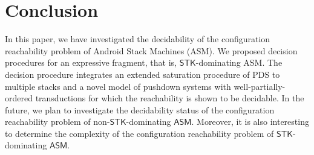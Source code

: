 \documentclass[preprint,12pt]{elsarticle}
\newcommand{\AMASS}{\textsf{ASM}}
\newcommand{\STK}{\mathsf{STK}}
\newcommand{\PDS}{\textsf{PDS}}
\begin{document}
\section{Conclusion}
% 
In this paper, we have investigated the decidability of the configuration reachability problem of Android Stack Machines (\AMASS). We proposed decision procedures for an expressive fragment, that is, $\STK$-dominating {\AMASS}. The decision procedure integrates 
an extended saturation procedure of {\PDS} to multiple stacks and a novel model of pushdown systems with well-partially-ordered transductions for which the reachability is shown to be decidable. In the future, we plan to investigate the decidability status of the configuration reachability problem of non-$\STK$-dominating $\AMASS$. Moreover, it is also interesting to determine the complexity of the configuration reachability problem of $\STK$-dominating $\AMASS$. 

%
 


 
\end{document}
